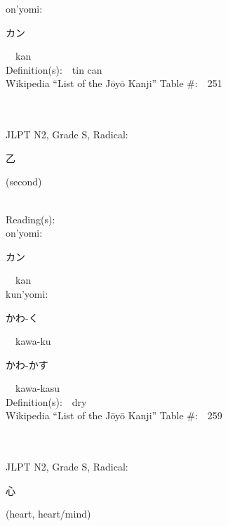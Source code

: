 \begin{multicols}{2}
{\hspace*{1em}}on'yomi:\ \ \\
{\hspace*{2em}}{\begin{CJK}{UTF8}{min} カン \end{CJK}}\ \ kan\ \ \\
Definition(s):\ \ tin can \\
Wikipedia ``List of the J\=oy\=o Kanji'' Table \#:\ \ 251 \\
\ \ \\
{\fontsize{34pt}{40pt}  }\ \ \\  %
{JLPT N2, Grade S, Radical:\ \ {\begin{CJK}{UTF8}{min} 乙 \end{CJK}} (second) } \\
Reading(s):\ \ \\
{\hspace*{1em}}on'yomi:\ \ \\
{\hspace*{2em}}{\begin{CJK}{UTF8}{min} カン \end{CJK}}\ \ kan\ \ \\
{\hspace*{1em}}kun'yomi:\ \ \\
{\hspace*{2em}}{\begin{CJK}{UTF8}{min} かわ-く \end{CJK}}\ \ kawa-ku\ \ \\
{\hspace*{2em}}{\begin{CJK}{UTF8}{min} かわ-かす \end{CJK}}\ \ kawa-kasu\ \ \\
Definition(s):\ \ dry \\
Wikipedia ``List of the J\=oy\=o Kanji'' Table \#:\ \ 259 \\
\ \ \\
{\fontsize{34pt}{40pt}  }\ \ \\  %
{JLPT N2, Grade S, Radical:\ \ {\begin{CJK}{UTF8}{min} 心 \end{CJK}} (heart, heart/mind) } \\

\end{multicols}
